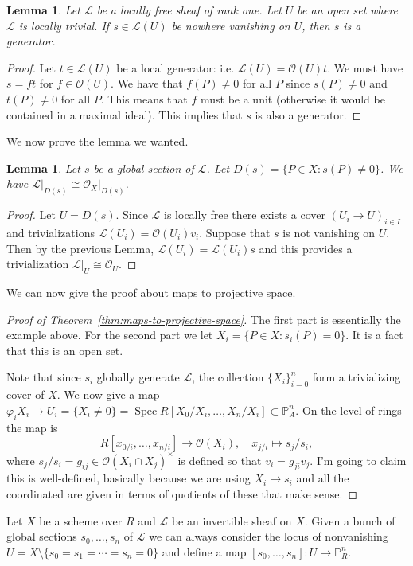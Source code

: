 \documentclass[12pt]{article}
\numberwithin{equation}{section}
\newtheorem{lemma}[theorem]{Lemma}
\theoremstyle{definition}
\theoremstyle{remark}
\newcommand{\Ocal}{\mathcal{O}}
\newcommand{\PP}{\mathbb{P}}
\newcommand{\Spec}{\operatorname{Spec}}
\newcommand{\Lcal}{\mathcal{L}}
\begin{document}
\begin{lemma}
	Let $\Lcal$ be a locally free sheaf of rank one. 
	Let $U$ be an open set where $\Lcal$ is locally trivial. 
	If $s \in \Lcal(U)$ be nowhere vanishing on $U$, then $s$ is a generator.  
\end{lemma}
\begin{proof}
	Let $t \in \Lcal(U)$ be a local generator: i.e. $\Lcal(U) = \Ocal(U)t$.
	We must have $s = ft$ for $f\in\Ocal(U)$. 
	We have that $f(P) \neq 0$ for all $P$ since $s(P)\neq 0$ and  $t(P)\neq 0$ for all $P$. 
	This means that $f$ must be a unit (otherwise it would be contained in a maximal ideal). 
	This implies that $s$ is also a generator.
\end{proof}
We now prove the lemma we wanted.
\begin{lemma}
	Let $s$ be a global section of $\Lcal$. 
	Let $D(s) = \lbrace P \in X \colon s(P) \neq 0\rbrace$. 
	We have $\Lcal\vert_{D(s)} \cong \Ocal_X\vert_{D(s)}$.
\end{lemma}
\begin{proof}
	Let $U = D(s)$.
	Since $\Lcal$ is locally free there exists a cover $(U_i \to U)_{i\in I}$ and trivializations $\Lcal(U_i) = \Ocal(U_i)v_i$. 
	Suppose that $s$ is not vanishing on $U$. 
	Then by the previous Lemma, $\Lcal(U_i) = \Lcal(U_i)s$ and this provides a trivialization $\Lcal\vert_U \cong \Ocal_U$.
\end{proof}
We can now give the proof about maps to projective space. 
\begin{proof}[Proof of Theorem~\ref{thm:maps-to-projective-space}]
	The first part is essentially the example above. 
	For the second part we let $X_i = \lbrace P \in X \colon s_i(P)=0 \rbrace$. 
	It is a fact that this is an open set. 
	
	Note that since $s_i$ globally generate $\Lcal$, the collection $\lbrace X_i \rbrace_{i=0}^n$ form a trivializing cover of $X$.
	We now give a map $\varphi_iX_i \to U_i = \lbrace X_i \neq 0 \rbrace  = \Spec R[X_0/X_i,\ldots,X_n/X_i] \subset \PP^n_A$. 
	On the level of rings the map is
	$$ R[x_{0/i},\ldots, x_{n/i}] \to \Ocal(X_i), \quad x_{j/i} \mapsto s_j/s_i, $$
	where $s_j/s_i =g_{ij} \in \Ocal(X_i\cap X_j)^{\times}$ is defined so that $v_i = g_{ji} v_j$. 
	I'm going to claim this is well-defined, basically because we are using $X_i \to s_i$ and all the coordinated are given in terms of quotients of these that make sense.
\end{proof}


Let $X$ be a scheme over $R$ and $\Lcal$ be an invertible sheaf on $X$. 
Given a bunch of global sections $s_0,\ldots,s_n$ of $\Lcal$ we can always consider the locus of nonvanishing $U = X \setminus \lbrace s_0=s_1=\cdots=s_n=0\rbrace$ and define a map $[s_0,\ldots,s_n]: U \to \PP^n_R$. 
\end{document}
